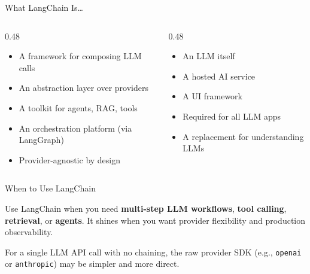 \documentclass[aspectratio=169,11pt]{beamer}
\begin{document}
\begin{frame}{What LangChain Is\ldots}

\begin{columns}[T]
\begin{column}{0.48\textwidth}
\begin{tipbox}[LangChain IS]
\begin{itemize}\setlength{\itemsep}{1pt}
  \item A framework for composing LLM calls
  \item An abstraction layer over providers
  \item A toolkit for agents, RAG, tools
  \item An orchestration platform (via LangGraph)
  \item Provider-agnostic by design
\end{itemize}
\end{tipbox}
\end{column}

\begin{column}{0.48\textwidth}
\begin{warningbox}
\begin{itemize}\setlength{\itemsep}{1pt}
  \item An LLM itself
  \item A hosted AI service
  \item A UI framework
  \item Required for all LLM apps
  \item A replacement for understanding LLMs
\end{itemize}
\end{warningbox}
\end{column}
\end{columns}
\end{frame}

\begin{frame}{When to Use LangChain}

\begin{tipbox}
Use LangChain when you need \textbf{multi-step LLM workflows}, \textbf{tool calling}, \textbf{retrieval}, or \textbf{agents}. It shines when you want provider flexibility and production observability.
\end{tipbox}

\vspace{0.3cm}

\begin{warningbox}
For a single LLM API call with no chaining, the raw provider SDK (e.g., \texttt{openai} or \texttt{anthropic}) may be simpler and more direct.
\end{warningbox}
\end{frame}
\end{document}

